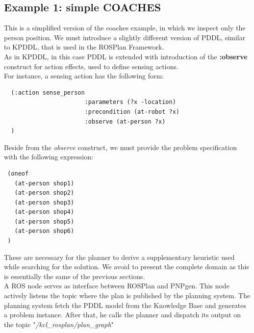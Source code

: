 \documentclass[pdftex,12pt,a4paper]{report}
\begin{document}
\subsection{Example 1: simple COACHES}
This is a simplified version of the coaches example, in which we inspect only the person position.
We must introduce a slightly different version of PDDL, similar to KPDDL, that is used in the ROSPlan Framework.\\
As in KPDDL, in this case PDDL is extended with introduction of the \textbf{:observe} construct for action effects, used to define sensing actions.\\
For instance, a sensing action has the following form:
\begin{verbatim}
  (:action sense_person
                       :parameters (?x -location)
                       :precondition (at-robot ?x)
                       :observe (at-person ?x)
  )
\end{verbatim}
Beside from the \textit{observe} construct, we must provide the problem specification with the following expression:
\begin{verbatim}
 (oneof
   (at-person shop1)
   (at-person shop2)
   (at-person shop3)
   (at-person shop4)
   (at-person shop5)
   (at-person shop6)
 )
\end{verbatim}
These are necessary for the planner to derive a supplementary heuristic used while searching for the solution. We avoid to present the complete domain as this is essentially the same of the previous sections.\\

\noindent A ROS node serves as interface between ROSPlan and PNPgen. This node actively listens the topic where the plan is published by the planning system. 
\noindent The planning system fetch the PDDL model from the Knowledge Base and generates a problem instance.
After that, he calls the planner and dispatch its output on the topic "\textit{/kcl\_rosplan/plan\_graph}"
\end{document}
